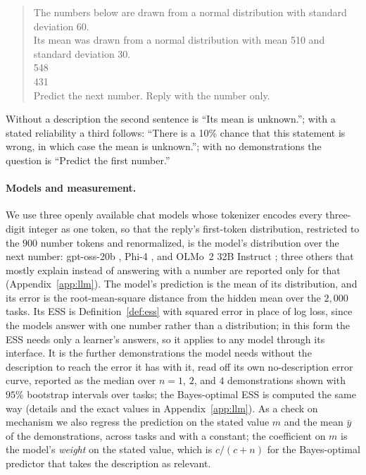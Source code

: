 \documentclass{article}
\begin{document}
\begin{quote}\small\ttfamily
The numbers below are drawn from a normal distribution with standard deviation 60.\\
Its mean was drawn from a normal distribution with mean 510 and standard deviation 30.\\[3pt]
548\\
431\\[3pt]
Predict the next number. Reply with the number only.
\end{quote}

\noindent Without a description the second sentence is ``Its mean is unknown.''; with a stated reliability a third follows: ``There is a 10\% chance that this statement is wrong, in which case the mean is unknown.''; with no demonstrations the question is ``Predict the first number.''

\paragraph{Models and measurement.} We use three openly available chat models whose tokenizer encodes every three-digit integer as one token, so that the reply's first-token distribution, restricted to the $900$ number tokens and renormalized, is the model's distribution over the next number: gpt-oss-20b \citep{openai2025}, Phi-4 \citep{abdin2024}, and OLMo~2 32B Instruct \citep{walsh2025}; three others that mostly explain instead of answering with a number are reported only for that (Appendix~\ref{app:llm}). The model's prediction is the mean of its distribution, and its error is the root-mean-square distance from the hidden mean over the $2{,}000$ tasks. Its ESS is Definition~\ref{def:ess} with squared error in place of log loss, since the models answer with one number rather than a distribution; in this form the ESS needs only a learner's answers, so it applies to any model through its interface. It is the further demonstrations the model needs without the description to reach the error it has with it, read off its own no-description error curve, reported as the median over $n = 1$, $2$, and $4$ demonstrations shown with $95\%$ bootstrap intervals over tasks; the Bayes-optimal ESS is computed the same way (details and the exact values in Appendix~\ref{app:llm}). As a check on mechanism we also regress the prediction on the stated value $m$ and the mean $\bar y$ of the demonstrations, across tasks and with a constant; the coefficient on $m$ is the model's \emph{weight} on the stated value, which is $c/(c+n)$ for the Bayes-optimal predictor that takes the description as relevant.
\end{document}
